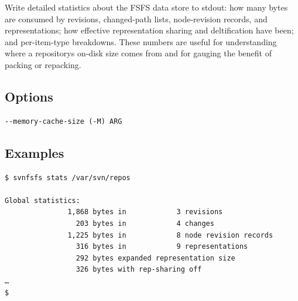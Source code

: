 Write detailed statistics about the FSFS data store to stdout: how many
bytes are consumed by revisions, changed-path lists, node-revision
records, and representations; how effective representation sharing and
deltification have been; and per-item-type breakdowns. These numbers are
useful for understanding where a repository\textquotesingle s on-disk
size comes from and for gauging the benefit of packing or repacking.

\subsection{Options}

\begin{verbatim}
--memory-cache-size (-M) ARG
\end{verbatim}

\subsection{Examples}

\begin{verbatim}
$ svnfsfs stats /var/svn/repos

Global statistics:
               1,868 bytes in            3 revisions
                 203 bytes in            4 changes
               1,225 bytes in            8 node revision records
                 316 bytes in            9 representations
                 292 bytes expanded representation size
                 326 bytes with rep-sharing off
…
$
\end{verbatim}
